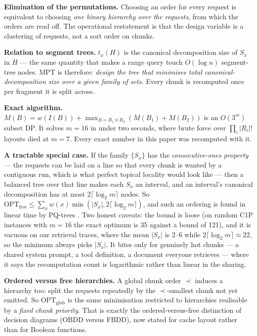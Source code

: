 \documentclass[11pt]{article}
\theoremstyle{plain}
\begin{document}
\textbf{Elimination of the permutations.} Choosing an order for every request is equivalent to choosing \emph{one binary hierarchy over the requests}, from which the orders are read off. The operational restatement is that the design variable is a clustering of requests, not a sort order on chunks.

\textbf{Relation to segment trees.} $t_x(H)$ is the canonical decomposition size of $S_x$ in $H$ --- the same quantity that makes a range query touch $O(\log n)$ segment-tree nodes. MPT is therefore: \emph{design the tree that minimises total canonical-decomposition size over a given family of sets.} Every chunk is recomputed once per fragment it is split across.

\textbf{Exact algorithm.} $M(B) = w(I(B)) + \max_{B = B_1 \uplus B_2}(M(B_1)+M(B_2))$ is an $O(3^m)$ subset DP. It solves $m = 16$ in under two seconds, where brute force over $\prod_i |R_i|!$ layouts died at $m = 7$. Every exact number in this paper was recomputed with it.

\textbf{A tractable special case.} If the family $\{S_x\}$ has the \emph{consecutive-ones property} --- the requests can be laid on a line so that every chunk is wanted by a contiguous run, which is what perfect topical locality would look like --- then a balanced tree over that line makes each $S_x$ an interval, and an interval's canonical decomposition has at most $2\lceil\log_2 m\rceil$ nodes. So $\mathrm{OPT}_{\mathrm{free}} \le \sum_x w(x)\min(|S_x|, 2\lceil\log_2 m\rceil)$, and such an ordering is found in linear time by PQ-trees \cite{BL76}. Two honest caveats: the bound is loose (on random C1P instances with $m=16$ the exact optimum is 35 against a bound of 121), and it is vacuous on our retrieval traces, where the mean $|S_x|$ is 2--6 while $2\lceil\log_2 m\rceil \approx 22$, so the minimum always picks $|S_x|$. It bites only for genuinely hot chunks --- a shared system prompt, a tool definition, a document everyone retrieves --- where it says the recomputation count is logarithmic rather than linear in the sharing.

\textbf{Ordered versus free hierarchies.} A global chunk order $\prec$ induces a hierarchy too: split the requests repeatedly by the $\prec$-smallest chunk not yet emitted. So $\mathrm{OPT}_{\mathrm{glob}}$ is the same minimisation restricted to hierarchies realisable by a \emph{fixed chunk priority}. That is exactly the ordered-versus-free distinction of decision diagrams (OBDD versus FBDD), now stated for cache layout rather than for Boolean functions.
\end{document}
